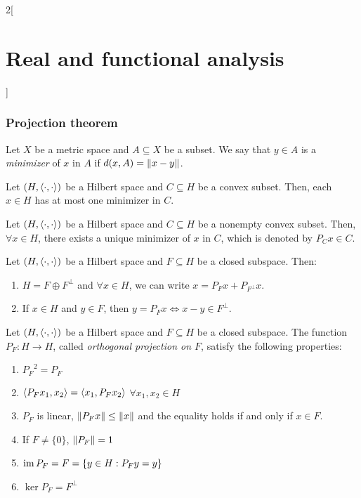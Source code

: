 \documentclass[../../../main_math.tex]{subfiles}
\begin{document}
\begin{multicols}{2}[\section{Real and functional analysis}]
  \subsubsection{Projection theorem}
  \begin{definition}
    Let $X$ be a metric space and $A\subseteq X$ be a subset. We say that $y\in A$ is a \emph{minimizer} of $x$ in $A$ if $d(x, A)=\left\|x-y\right\|$.
  \end{definition}
  \begin{proposition}
    Let $(H,{\left\langle\cdot,\cdot\right\rangle})$ be a Hilbert space and $C\subseteq H$ be a convex subset. Then, each $x\in H$ has at most one minimizer in $C$.
  \end{proposition}
  \begin{theorem}
    Let $(H,{\left\langle\cdot,\cdot\right\rangle})$ be a Hilbert space and $C\subseteq H$ be a nonempty convex subset. Then, $\forall x\in H$, there exists a unique minimizer of $x$ in $C$, which is denoted by $P_Cx\in C$.
  \end{theorem}
  \begin{theorem}
    Let $(H,{\left\langle\cdot,\cdot\right\rangle})$ be a Hilbert space and $F\subseteq H$ be a closed subspace. Then:
    \begin{enumerate}
      \item $H=F\oplus F^\perp$ and $\forall x\in H$, we can write $x=P_Fx+P_{F^\perp}x$.
      \item If $x\in H$ and $y\in F$, then $y=P_Fx\iff x-y\in F^\perp$.
    \end{enumerate}
  \end{theorem}
  \begin{corollary}
    Let $(H,{\left\langle\cdot,\cdot\right\rangle})$ be a Hilbert space and $F\subseteq H$ be a closed subspace. The function $P_F:H\rightarrow H$, called \emph{orthogonal projection on $F$}, satisfy the following properties:
    \begin{enumerate}
      \item ${P_F}^2 = P_F$
      \item ${\left\langle P_Fx_1,x_2\right\rangle}={\left\langle x_1,P_Fx_2\right\rangle}$ $\forall x_1, x_2\in H$
      \item $P_F$ is linear, $\left\|P_Fx\right\|\leq \left\|x\right\|$ and the equality holds if and only if $x\in F$.
      \item If $F\ne\{0\}$, $\left\|P_F\right\|=1$
      \item $\operatorname{im} P_F=F=\{y\in H:P_Fy=y\}$
      \item $\ker P_F=F^\perp$
    \end{enumerate}
  \end{corollary}

\end{multicols}
\end{document}
